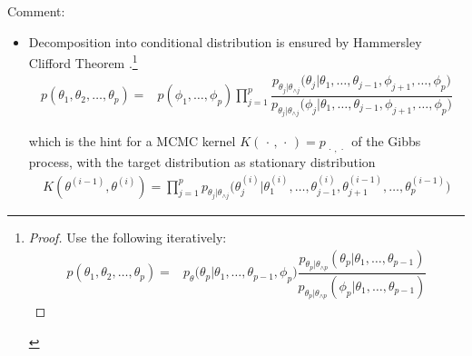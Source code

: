 Comment:
\begin{itemize}[topsep=2pt,itemsep=0pt]
    \item Decomposition into conditional distribution is ensured by Hammersley Clifford Theorem .\footnote{\begin{proof}
        Use the following iteratively:
        \begin{align}
            p(\theta _1,\theta _2,\ldots,\theta _p)=&p_{\theta}\big( \theta _p | \theta _1,\ldots , \theta _{p-1} ,\phi _p\big) \dfrac{ p_{\theta _p|\theta _{\wedge p}}(\theta _p|\theta _1,\ldots, \theta _{p-1}) }{ p_{\theta _p|\theta _{\wedge p}}(\phi  _p|\theta _1,\ldots, \theta _{p-1}) } 
        \end{align}
    \end{proof}}
    \begin{align}
         p(\theta _1,\theta _2,\ldots,\theta _p)=&p(\phi _1,\ldots,\phi _p)\prod_{j=1}^p \dfrac{ p_{\theta _j|\theta _{\wedge j}}\big( \theta _j | \theta _1,\ldots , \theta _{j-1},\phi _{j+1},\ldots, \phi _p \big) }{ p_{\theta _j|\theta _{\wedge j}}\big( \phi  _j | \theta _1,\ldots , \theta _{j-1},\phi _{j+1},\ldots, \phi _p \big) } 
    \end{align}

    which is the hint for a MCMC kernel $ K(\, \cdot \, ,\, \cdot \, )=p_{\, \cdot \, ,\, \cdot \, } $ of the Gibbs process, with the target distribution as stationary distribution
    \begin{align}
        K(\theta ^{(i-1)},\theta ^{(i)})=\prod_{j=1}^p p_{\theta _j|\theta _{\wedge j}}\big( \theta _j^{(i)} | \theta _1^{(i)},\ldots , \theta _{j-1}^{(i)},\theta _{j+1}^{(i-1)},\ldots, \theta _p^{(i-1)} \big)
    \end{align}
    

\end{itemize}
